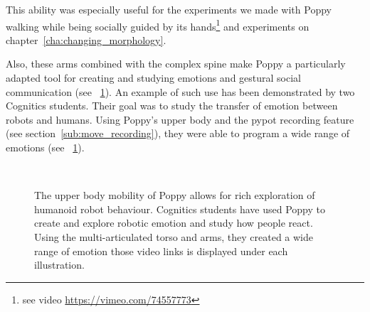 This ability was especially useful for the experiments we made with Poppy walking while being socially guided by its hands\footnote{see video \url{https://vimeo.com/74557773}} and experiments on chapter~\ref{cha:changing_morphology}.

Also, these arms combined with the complex spine make Poppy a particularly adapted tool for creating and studying emotions and gestural social communication (see \figurename~\ref{fig:TER_cognitic}). An example of such use has been demonstrated by two Cognitics students. Their goal was to study the transfer of emotion between robots and humans. Using Poppy's upper body and the pypot recording feature (see section~\ref{sub:move_recording}), they were able to program a wide range of emotions (see \figurename~\ref{fig:TER_cognitic}).


\begin{figure}[tb]
\centering
    \hfil
    \\
    \hfil
    \caption{The upper body mobility of Poppy allows for rich exploration of humanoid robot behaviour. Cognitics students have used Poppy to create and explore robotic emotion and study how people react. Using the multi-articulated torso and arms, they created a wide range of emotion those video links is displayed under each illustration. }
    \label{fig:TER_cognitic}
\end{figure}


